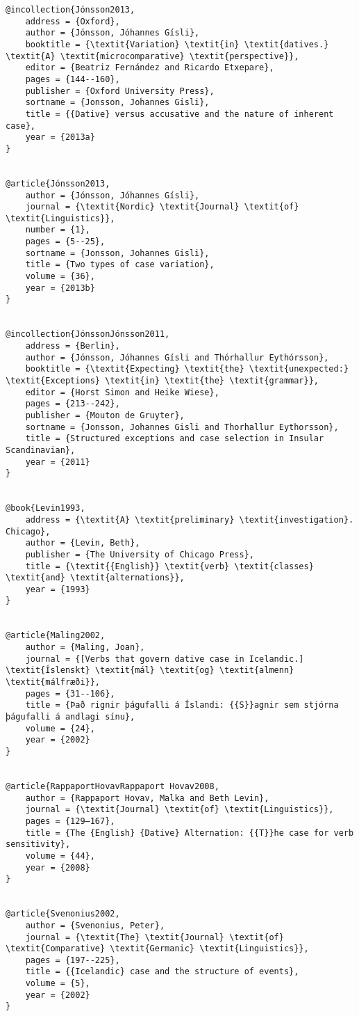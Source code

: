 \begin{verbatim}
@incollection{Jónsson2013,
	address = {Oxford},
	author = {Jónsson, Jóhannes Gísli},
	booktitle = {\textit{Variation} \textit{in} \textit{datives.} \textit{A} \textit{microcomparative} \textit{perspective}},
	editor = {Beatriz Fernández and Ricardo Etxepare},
	pages = {144--160},
	publisher = {Oxford University Press},
	sortname = {Jonsson, Johannes Gisli},
	title = {{Dative} versus accusative and the nature of inherent case},
	year = {2013a}
}


@article{Jónsson2013,
	author = {Jónsson, Jóhannes Gísli},
	journal = {\textit{Nordic} \textit{Journal} \textit{of} \textit{Linguistics}},
	number = {1},
	pages = {5--25},
	sortname = {Jonsson, Johannes Gisli},
	title = {Two types of case variation},
	volume = {36},
	year = {2013b}
}


@incollection{JónssonJónsson2011,
	address = {Berlin},
	author = {Jónsson, Jóhannes Gísli and Thórhallur Eythórsson},
	booktitle = {\textit{Expecting} \textit{the} \textit{unexpected:} \textit{Exceptions} \textit{in} \textit{the} \textit{grammar}},
	editor = {Horst Simon and Heike Wiese},
	pages = {213--242},
	publisher = {Mouton de Gruyter},
	sortname = {Jonsson, Johannes Gisli and Thorhallur Eythorsson},
	title = {Structured exceptions and case selection in Insular Scandinavian},
	year = {2011}
}


@book{Levin1993,
	address = {\textit{A} \textit{preliminary} \textit{investigation}. Chicago},
	author = {Levin, Beth},
	publisher = {The University of Chicago Press},
	title = {\textit{{English}} \textit{verb} \textit{classes} \textit{and} \textit{alternations}},
	year = {1993}
}


@article{Maling2002,
	author = {Maling, Joan},
	journal = {[Verbs that govern dative case in Icelandic.] \textit{Íslenskt} \textit{mál} \textit{og} \textit{almenn} \textit{málfræði}},
	pages = {31--106},
	title = {Það rignir þágufalli á Íslandi: {{S}}agnir sem stjórna þágufalli á andlagi sínu},
	volume = {24},
	year = {2002}
}


@article{RappaportHovavRappaport Hovav2008,
	author = {Rappaport Hovav, Malka and Beth Levin},
	journal = {\textit{Journal} \textit{of} \textit{Linguistics}},
	pages = {129–167},
	title = {The {English} {Dative} Alternation: {{T}}he case for verb sensitivity},
	volume = {44},
	year = {2008}
}


@article{Svenonius2002,
	author = {Svenonius, Peter},
	journal = {\textit{The} \textit{Journal} \textit{of} \textit{Comparative} \textit{Germanic} \textit{Linguistics}},
	pages = {197--225},
	title = {{Icelandic} case and the structure of events},
	volume = {5},
	year = {2002}
}



\end{verbatim}
